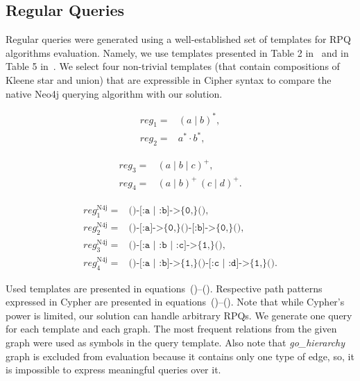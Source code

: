 \documentclass[
11pt,%
tightenlines,%
twoside,%
onecolumn,%
nobibnotes,%
nofootinbib,%
superscriptaddress,%
noshowpacs,%
longbibliography,%
centertags]%
{revtex4-2}
\begin{document}
\subsection{Regular Queries}

Regular queries were generated using a well-established set of templates for RPQ algorithms evaluation. Namely, we use templates presented in Table 2 in~\cite{Pacaci2020RegularPQ} and in Table 5 in~\cite{Wang2019}. We select four non-trivial templates (that contain compositions of Kleene star and union) that are expressible in Cipher syntax to compare the native Neo4j querying algorithm with our solution. 

\begin{minipage}{0.44\textwidth}
\begin{align}
\textit{reg}_1 = & (a \mid b)^*, \label{eqn:reg_1}\\
\textit{reg}_2 = & a^* \cdot b^*, \label{eqn:reg_2}
\end{align}
\end{minipage}
\begin{minipage}{0.44\textwidth}
\begin{align}
\textit{reg}_3 = & (a \mid b \mid c)^+, \label{eqn:reg_3}\\
\textit{reg}_4 = & (a \mid b)^+ \, (c \mid d)^+. \label{eqn:reg_4}
\end{align}
\end{minipage}
\begin{align}
\textit{reg}_1^{\text{N4j}} = & \texttt{()-[:a | :b]->\{0,\}()} \label{eqn:cypher_reg_1},\\
\textit{reg}_2^{\text{N4j}} = & \texttt{()-[:a]->\{0,\}()-[:b]->\{0,\}()} \label{eqn:cypher_reg_2},\\
\textit{reg}_3^{\text{N4j}} = & \texttt{()-[:a | :b | :c]->\{1,\}()} \label{eqn:cypher_reg_3},\\
\textit{reg}_4^{\text{N4j}} = & \texttt{()-[:a | :b]->\{1,\}()-[:c | :d]->\{1,\}()}. \label{eqn:cypher_reg_4}
\end{align}

Used templates are presented in equations~()--(). Respective path patterns expressed in Cypher are presented in equations~()--(). Note that while Cypher's power is limited, our solution can handle arbitrary RPQs. We generate one query for each template and each graph. The most frequent relations from the given graph were used as symbols in the query template.
Also note that \textit{go\_hierarchy} graph is excluded from evaluation because it contains only one type of edge, so, it is impossible to express meaningful queries over it. 
\end{document}
